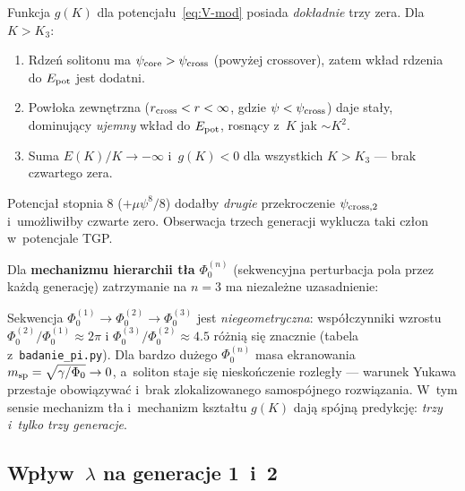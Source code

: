 \begin{proposition}%
\label{prop:brak-czwartej}
Funkcja $g(K)$ dla potencjału~\eqref{eq:V-mod} posiada \emph{dokładnie}
trzy zera. Dla $K > K_3$:
\begin{enumerate}[nosep,label=(\roman*)]
    \item Rdzeń solitonu ma $\psi_{\rm core} > \psi_{\rm cross}$
          (powyżej crossover), zatem wkład rdzenia do $E_{\rm pot}$ jest dodatni.
    \item Powłoka zewnętrzna ($r_{\rm cross} < r < \infty$, gdzie $\psi < \psi_{\rm cross}$)
          daje stały, dominujący \emph{ujemny} wkład do $E_{\rm pot}$,
          rosnący z~$K$ jak $\sim K^2$.
    \item Suma $E(K)/K \to -\infty$ i~$g(K) < 0$ dla wszystkich $K > K_3$ —
          brak czwartego zera.
\end{enumerate}
Potencjał stopnia 8 ($+ \mu\psi^8/8$) dodałby \emph{drugie} przekroczenie
$\psi_{\rm cross,2}$ i~umożliwiłby czwarte zero. Obserwacja trzech
generacji wyklucza taki człon w~potencjale TGP.
\end{proposition}

Dla \textbf{mechanizmu hierarchii tła} $\Phi_0^{(n)}$
(sekwencyjna perturbacja pola przez każdą generację)
zatrzymanie na $n=3$ ma niezależne uzasadnienie:

\begin{remark}%
\label{rem:hierarchia-ta}
Sekwencja $\Phi_0^{(1)} \to \Phi_0^{(2)} \to \Phi_0^{(3)}$ jest
\emph{niegeometryczna}: współczynniki wzrostu
$\Phi_0^{(2)}/\Phi_0^{(1)} \approx 2\pi$ i
$\Phi_0^{(3)}/\Phi_0^{(2)} \approx 4.5$ różnią się znacznie
(tabela z~\texttt{badanie\_pi.py}).
Dla bardzo dużego $\Phi_0^{(n)}$ masa ekranowania
$m_{\rm sp} = \sqrt{\gamma/\Phi_0} \to 0$, a~soliton staje się
nieskończenie rozległy — warunek Yukawa przestaje obowiązywać
i~brak zlokalizowanego samospójnego rozwiązania.
W~tym sensie mechanizm tła i~mechanizm kształtu $g(K)$
dają spójną predykcję: \emph{trzy i~tylko trzy generacje}.
\end{remark}

\subsection{Wpływ~$\lambda$ na generacje 1~i~2}%
\label{app:I-wplyw-M1-M2}

